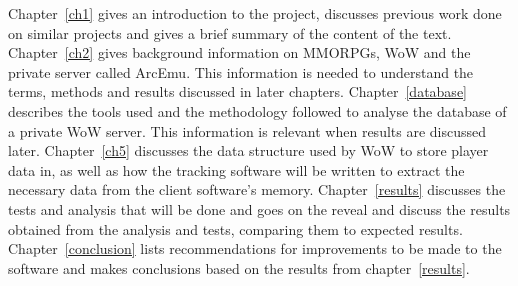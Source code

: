 Chapter~\ref{ch1} gives an introduction to the project, discusses previous work done on similar projects and gives a brief summary of the content of the text. Chapter~\ref{ch2} gives background information on MMORPGs, WoW and the private server called ArcEmu. This information is needed to understand the terms, methods and results discussed in later chapters. Chapter~\ref{database} describes the tools used and the methodology followed to analyse the database of a private WoW server. This information is relevant when results are discussed later. Chapter~\ref{ch5} discusses the data structure used by WoW to store player data in, as well as how the tracking software will be written to extract the necessary data from the client software's memory. Chapter~\ref{results} discusses the tests and analysis that will be done and goes on the reveal and discuss the results obtained from the analysis and tests, comparing them to expected results. Chapter~\ref{conclusion} lists recommendations for improvements to be made to the software and makes conclusions based on the results from chapter~\ref{results}.

